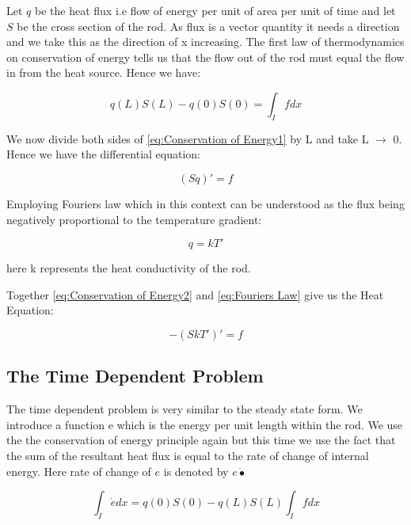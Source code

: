 \documentclass{uonmathreport}
\theoremstyle{definition}
\theoremstyle{problem}
\theoremstyle{theorem}
\begin{document}
Let $q$ be the heat flux i.e flow of energy per unit of area per unit of time and let $S$ be the cross section of the rod. As flux is a vector quantity it needs a direction and we take this as the direction of x increasing. The first law of thermodynamics on conservation of energy tells us that the flow out of the rod must equal the flow in from the heat source. Hence we have:

\begin{equation}
q(L)S(L) - q(0)S(0) =  \int_I  f  dx	\label{eq:Conservation of Energy1}
\end{equation}

We now divide both sides of \eqref{eq:Conservation of Energy1} by L and take L $\rightarrow$ 0. Hence we have the differential equation:

\begin{equation}
(Sq)' = f	\label{eq:Conservation of Energy2}
\end{equation}

Employing Fouriers law which in this context can be understood as the flux being negatively proportional to the temperature gradient:

\begin{equation}
q = kT'	\label{eq:Fouriers Law}
\end{equation}

here k represents the heat conductivity of the rod.

Together \eqref{eq:Conservation of Energy2} and \eqref{eq:Fouriers Law} give us the Heat Equation:

\begin{equation}
-(SkT')'= f 	\label{eq:Steady State Heat Equation}
\end{equation}


\subsection{The Time Dependent Problem} \label{subsec:Time Dependent Heat Equation}

The time dependent problem is very similar to the steady state form. We introduce a function e which is the energy per unit length within the rod. We use the the conservation of energy principle again but this time we use the fact that the sum of the resultant heat flux is equal to the rate of change of internal energy. Here rate of change of $e$ is denoted by $e\dot{•}$

\begin{equation}
\int_I  \dot{e} dx =   q(0)S(0) - q(L)S(L)  \int_I  f  dx	\label{eq:Conservation of Energyt1}
\end{equation}
\end{document}
